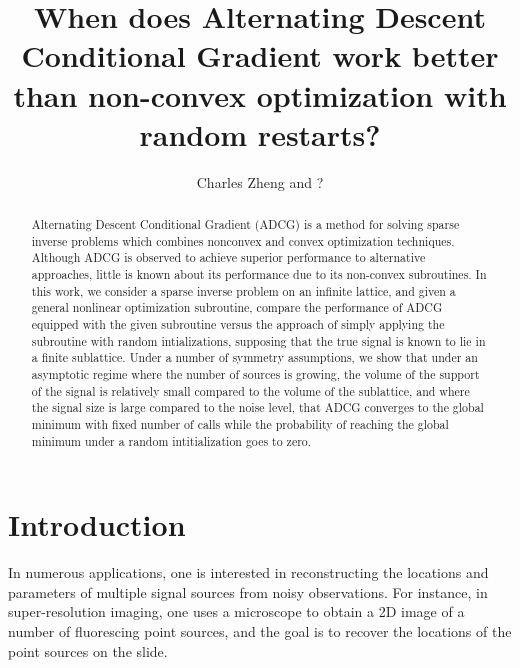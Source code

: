 \documentclass[11pt]{article}
\begin{document}
\newcommand{\tr}{\text{tr}}
\newcommand{\E}{\textbf{E}}
\newcommand{\diag}{\text{diag}}
\newcommand{\argmax}{\text{argmax}}
\newcommand{\argmin}{\text{argmin}}
\newcommand{\Cov}{\text{Cov}}
\newcommand{\Var}{\text{Var}}
\newcommand{\Vol}{\text{Vol}}
\newcommand{\HH}{\boldsymbol{H}}

\title{When does Alternating Descent Conditional Gradient work better than non-convex optimization with random restarts?}

\author{Charles Zheng and ?}

\maketitle

\begin{abstract}
Alternating Descent Conditional Gradient (ADCG) is a method for
solving sparse inverse problems which combines nonconvex and convex
optimization techniques.  Although ADCG is observed to achieve
superior performance to alternative approaches, little is known about
its performance due to its non-convex subroutines.  In this work, we
consider a sparse inverse problem on an infinite lattice, and given a
general nonlinear optimization subroutine, compare the performance of
ADCG equipped with the given subroutine versus the approach of simply
applying the subroutine with random intializations, supposing that the
true signal is known to lie in a finite sublattice.  Under a number of
symmetry assumptions, we show that under an asymptotic regime where
the number of sources is growing, the volume of the support of the
signal is relatively small compared to the volume of the sublattice,
and where the signal size is large compared to the noise level, that
ADCG converges to the global minimum with fixed number of calls while
the probability of reaching the global minimum under a random
intitialization goes to zero.
\end{abstract}

\section{Introduction}

In numerous applications, one is interested in reconstructing the
locations and parameters of multiple signal sources from noisy
observations.  For instance, in super-resolution imaging, one uses a
microscope to obtain a 2D image of a number of fluorescing point sources,
and the goal is to recover the locations of the point sources on the
slide.
\end{document}
